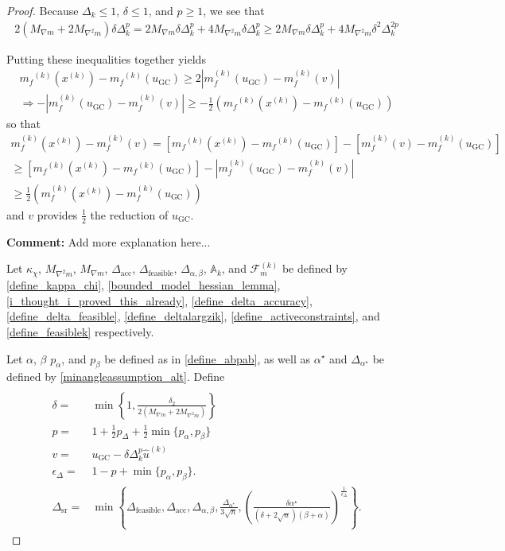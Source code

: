 \documentclass{article}
\newenvironment{comment}
  {\par\medskip
   \color{red}%
   \begin{framed}
   \textbf{Comment: }\ignorespaces}
 {\end{framed}
  \medskip}
\theoremstyle{case}
\numberwithin{theorem}{subsection}
\newcommand{\activeconstraintsk}{{\mathbb A_{k}}}
\newcommand{\dacc}{{\Delta_{\textrm{acc}}}}
\newcommand{\deltalargzik}{{\Delta_{\alpha,\beta}}}
\newcommand{\dfeas}{{\Delta_{\textrm{feasible}}}}
\newcommand{\dk}{\Delta_k}
\newcommand{\dsr}{{\Delta_{\textrm{sr}}}}
\newcommand{\feasiblek}{{\mathcal F_m^{(k)}}}
\newcommand{\huk}{{{\hat u}^{(k)}}}
\newcommand{\maxmodelhessian}{{M_{\nabla^2 m}}}
\newcommand{\mfk}{{{m}_f}^{(k)}}
\newcommand{\minanglealpha}{{ \alpha^{\star} }}
\newcommand{\minangledelta}{{\Delta_{\alpha^{\star}}}}
\newcommand{\xk}{x^{(k)}}
\newcommand{\maxmodelgrad}{{M_{\nabla m}}}
\begin{document}
\begin{proof}
Because $\dk \le 1$, $\delta \le 1$, and $p \ge 1$, we see that
\begin{align*}
2\left(\maxmodelgrad + 2\maxmodelhessian\right)\delta\dk^{p}
= 2\maxmodelgrad \delta \dk^p + 4\maxmodelhessian\delta\dk^{p}
\ge 2\maxmodelgrad \delta \dk^p + 4\maxmodelhessian\delta^2 \dk^{2p}
\end{align*}


Putting these inequalities together yields
\begin{align*}
\mfk(\xk) - \mfk(u_{\textrm{GC}}) \ge 2\left|m_f^{(k)}(u_{\textrm{GC}}) - m_f^{(k)}(v)\right| \\
\Longrightarrow -\left|m_f^{(k)}(u_{\textrm{GC}}) - m_f^{(k)}(v)\right| \ge -\frac 1 2 \left(\mfk(\xk) - \mfk(u_{\textrm{GC}})\right)
\end{align*}
so that
\begin{align}
m_f^{(k)}(\xk) - m_f^{(k)}(v) = \left[\mfk(\xk) - \mfk(u_{\textrm{GC}})\right] - \left[m_f^{(k)}(v) - m_f^{(k)}(u_{\textrm{GC}})\right] \nonumber \\
 \ge \left[\mfk(\xk) - \mfk(u_{\textrm{GC}})\right] - \left|m_f^{(k)}(u_{\textrm{GC}}) - m_f^{(k)}(v) \right| \nonumber \\
\ge \frac 1 2 \left(m_f^{(k)}(\xk) - m_f^{(k)}(u_{\textrm{GC}})\right) \label{sr_sr}
\end{align}
and $v$ provides $\frac 1 2$ the reduction of $u_{\textrm{GC}}$.



\begin{comment}
Add more explanation here...
\end{comment}

Let
$\kappa_{\chi}$,
$\maxmodelhessian$,
$\maxmodelgrad$,
$\dacc$,
$\dfeas$,
$\deltalargzik$,
$\activeconstraintsk$,
and $\feasiblek$
be defined by
\cref{define_kappa_chi},
\cref{bounded_model_hessian_lemma},
\cref{i_thought_i_proved_this_already},
\cref{define_delta_accuracy},
\cref{define_delta_feasible},
\cref{define_deltalargzik},
\cref{define_activeconstraints},
and \cref{define_feasiblek}
respectively.

Let $\alpha$, $\beta$ $p_{\alpha}$, and $p_{\beta}$
be defined as in \cref{define_abpab}, as well as $\minanglealpha$ and $\minangledelta$ be defined by \cref{minangleassumption_alt}.
Define
\begin{align}
 \\
\delta =& \min\left\{1, \frac{\delta_2}{2\left(\maxmodelgrad + 2 \maxmodelhessian \right)}\right\} \label{sr_define_delta} \\
p =& 1 + \frac 1 2 p_{\Delta} + \frac 1 2\min\{p_{\alpha}, p_{\beta}\} \label{sr_def_p}\\
v =& u_{\textrm{GC}} - \delta \dk^{p} \huk \label{define_v} \\
\epsilon_{\Delta} =& 1-p+\min\{p_{\alpha}, p_{\beta}\}. \label{sr_def_epsilon_delta} \\
\dsr =& \min\left\{
\dfeas,
\dacc,
\deltalargzik,
\frac{\minangledelta}{3\sqrt{n}},
\left(\frac{\delta \minanglealpha}{\left(\delta + 2\sqrt{n}\right)\left(\beta +\alpha\right)}\right)^{\frac 1 {\epsilon_{\Delta}}}
\right\} \label{define_delta_sufficient_reduction}.
\end{align}


\end{proof}
\end{document}
